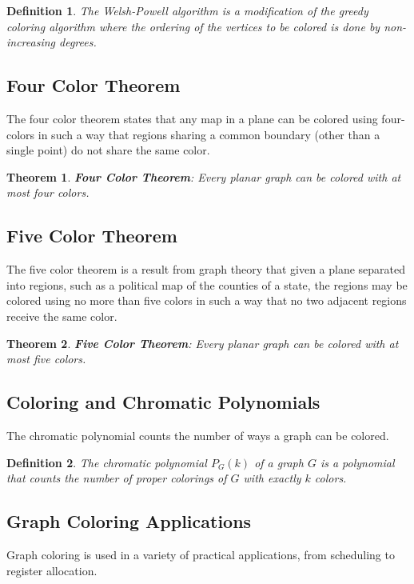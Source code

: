 \documentclass{article}
\newtheorem{definition}{Definition}
\newtheorem{theorem}{Theorem}
\begin{document}
\begin{definition}
	The \textit{Welsh-Powell algorithm} is a modification of the greedy coloring algorithm where the ordering of the vertices to be colored is done by non-increasing degrees.
\end{definition}

\subsection{Four Color Theorem}
The four color theorem states that any map in a plane can be colored using four-colors in such a way that regions sharing a common boundary (other than a single point) do not share the same color.

\begin{theorem}
	\textbf{Four Color Theorem}: Every planar graph can be colored with at most four colors.
\end{theorem}

\subsection{Five Color Theorem}
The five color theorem is a result from graph theory that given a plane separated into regions, such as a political map of the counties of a state, the regions may be colored using no more than five colors in such a way that no two adjacent regions receive the same color.

\begin{theorem}
	\textbf{Five Color Theorem}: Every planar graph can be colored with at most five colors.
\end{theorem}

\subsection{Coloring and Chromatic Polynomials}
The chromatic polynomial counts the number of ways a graph can be colored.

\begin{definition}
	The \textit{chromatic polynomial} \(P_G(k)\) of a graph \(G\) is a polynomial that counts the number of proper colorings of \(G\) with exactly \(k\) colors.
\end{definition}

\subsection{Graph Coloring Applications}
Graph coloring is used in a variety of practical applications, from scheduling to register allocation.
\end{document}
